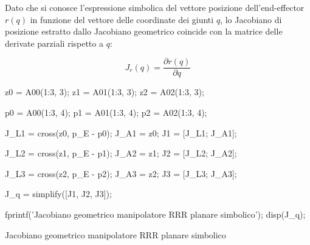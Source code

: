 \documentclass[11pt, a4paper]{article}
\begin{document}
\begin{par}
\newpage
\begin{flushleft}
Dato che si conosce l'espressione simbolica del vettore posizione dell'end-effector $r(q)$ in funzione del vettore delle coordinate dei giunti $q$, lo Jacobiano di posizione estratto dallo Jacobiano geometrico coincide con la matrice delle derivate parziali rispetto a $q$:
\end{flushleft}
\end{par}

\[
    J_r (q) = \frac{\partial r(q)}{\partial q}
\]

\vspace{1em}
\begin{matlabcode}
z0 = A00(1:3, 3); %
z1 = A01(1:3, 3); %
z2 = A02(1:3, 3); %

p0 = A00(1:3, 4); %
p1 = A01(1:3, 4); %
p2 = A02(1:3, 4); %

J_L1 = cross(z0, p_E - p0);
J_A1 = z0;
J1 = [J_L1; J_A1];

J_L2 = cross(z1, p_E - p1);
J_A2 = z1;
J2 = [J_L2; J_A2];

J_L3 = cross(z2, p_E - p2);
J_A3 = z2;
J3 = [J_L3; J_A3];

J_q = simplify([J1, J2, J3]);

fprintf('Jacobiano geometrico manipolatore RRR planare simbolico');
disp(J_q);
\end{matlabcode}
\begin{matlaboutput}
Jacobiano geometrico manipolatore RRR planare simbolico
\end{matlaboutput}
\end{document}
